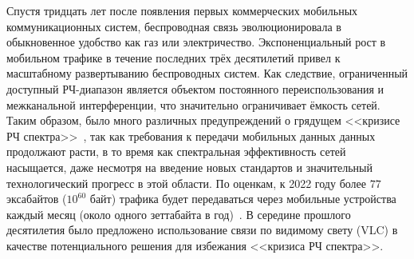 \Introduction
{}

Спустя тридцать лет после появления первых коммерческих мобильных коммуникационных систем, беспроводная связь эволюционировала в обыкновенное удобство как газ или электричество. Экспоненциальный рост в мобильном трафике в течение последних трёх десятилетий привел к масштабному развертыванию беспроводных систем. Как следствие, ограниченный доступный РЧ-диапазон является объектом постоянного переиспользования и межканальной интерференции, что значительно ограничивает ёмкость сетей. Таким образом, было много различных предупреждений о грядущем <<кризисе РЧ спектра>>~\cite{Ofcom2013}, так как требования к передачи мобильных данных данных продолжают расти, в то время как спектральная эффективность сетей насыщается, даже несмотря на введение новых стандартов и значительный технологический прогресс в этой области. По оценкам, к 2022 году более $77$ эксабайтов ($10^{60}$ байт) трафика будет передаваться через мобильные устройства каждый месяц (около одного зеттабайта в год)~\cite{Cisco2019}. В середине прошлого десятилетия было предложено использование связи по видимому свету (VLC) в качестве потенциального решения для избежания <<кризиса РЧ спектра>>.



